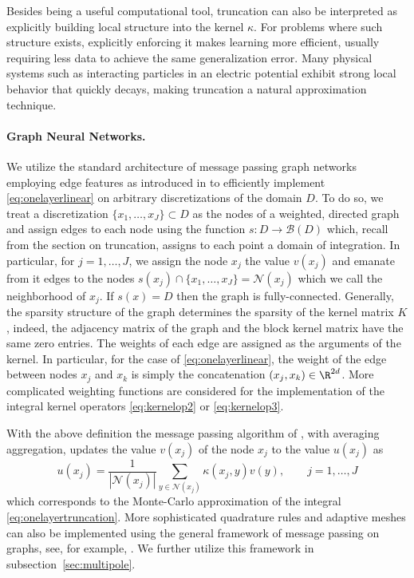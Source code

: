 Besides being a useful computational tool, truncation can also be interpreted as explicitly building local structure into the kernel \(\kappa\). For problems where such structure exists, explicitly enforcing it makes learning more efficient, usually requiring less data to achieve the same generalization error. Many physical systems such as interacting particles in an electric potential exhibit strong local behavior that quickly decays, making truncation a natural approximation technique. 

\paragraph{Graph Neural Networks. }
We utilize the standard architecture of message passing graph networks employing edge features as introduced in \cite{gilmer2017neural} to efficiently implement \eqref{eq:onelayerlinear} on arbitrary discretizations of the domain \(D\). To do so, we treat a discretization \(\{x_1,\dots,x_J\} \subset D\) as the nodes of a weighted, directed graph and assign edges to each node using the function \(s : D \to \mathcal{B}(D)\) which, recall from the section on truncation, assigns to each point a domain of integration. In particular, for \(j=1,\dots,J\), we assign the node \(x_j\) the value \(v(x_j)\) and emanate from it edges to the nodes \(s(x_j) \cap \{x_1,\dots,x_J\} = \mathcal{N}(x_j)\) which we call the neighborhood of \(x_j\). If \(s(x) = D\) then the graph is fully-connected. Generally, the sparsity structure of the graph determines the sparsity of the kernel matrix \(K\), indeed, the adjacency matrix of the graph and the block kernel matrix have the same zero entries. The weights of each edge are assigned as the arguments of the kernel. In particular, for the case of \eqref{eq:onelayerlinear}, the weight of the edge between nodes \(x_j\) and \(x_k\) is simply the concatenation \((x_j,x_k) \in \R^{2d}\).  More complicated weighting functions are considered for the implementation of the integral kernel operators \eqref{eq:kernelop2} or \eqref{eq:kernelop3}.

With the above definition the message passing algorithm of \cite{gilmer2017neural}, with averaging aggregation, updates the value \(v(x_j)\) of the node \(x_j\) to the value \(u(x_j)\) as 
\[u(x_j) = \frac{1}{|\mathcal{N}(x_j)|}\sum_{y \in \mathcal{N}(x_j)} \kappa(x_j, y) v(y), \qquad j=1,\dots,J\]
which corresponds to the Monte-Carlo approximation of the integral \eqref{eq:onelayertruncation}. More sophisticated quadrature rules and adaptive meshes can also be implemented using the general framework of message passing on graphs, see, for example, \cite{pfaff2020learning}. We further utilize this framework in subsection~\ref{sec:multipole}.


